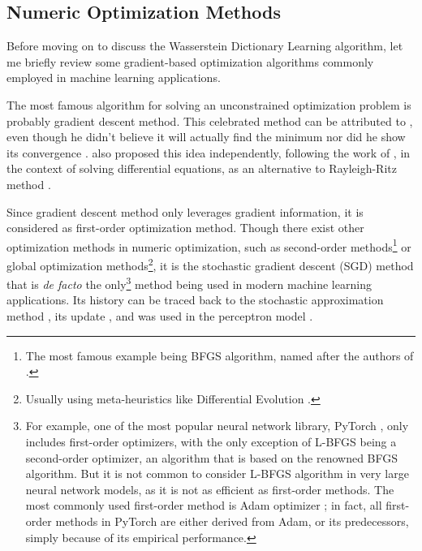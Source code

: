 


\subsection{Numeric Optimization Methods}\label{subsec:numeric-optimization-methods}

Before moving on to discuss the Wasserstein Dictionary Learning algorithm,
let me briefly review some gradient-based optimization algorithms commonly employed in machine learning applications.

The most famous algorithm for solving an unconstrained optimization problem is probably gradient descent method.
This celebrated method can be attributed to \citet{cauchy1847}, even though he didn't
believe it will actually find the minimum nor did he show its convergence \citep{lemarechal2012}.
\citet{hadamard1908} also proposed this idea independently, following the work of \citet{hilbert1900},
in the context of solving differential equations,
as an alternative to Rayleigh-Ritz method \citep{rayleigh1896,ritz1909,courant1943}.

Since gradient descent method only leverages gradient information, it is considered as first-order optimization method.
Though there exist other optimization methods in numeric optimization,
such as second-order methods\footnote{
  The most famous example being BFGS algorithm,
  named after the authors of \citet{broyden1970,fletcher1970,goldfarb1970,shanno1970}.
} or global optimization methods\footnote{
  Usually using meta-heuristics like Differential Evolution \citep{storn1997}.
},
it is the stochastic gradient descent (SGD) method that is \textit{de facto} the only\footnote{
  For example, one of the most popular neural network library, PyTorch \citep{paszke2017},
  only includes first-order optimizers, with the only exception of L-BFGS \citep{liu1989} being a second-order optimizer,
  an algorithm that is based on the renowned BFGS algorithm.
  But it is not common to consider L-BFGS algorithm in very large neural network models,
  as it is not as efficient as first-order methods.
  The most commonly used first-order method is Adam optimizer \citep{kingma2015};
  in fact, all first-order methods in PyTorch are either derived from Adam, or its predecessors,
  simply because of its empirical performance.
}
method being used in modern machine learning applications.
Its history can be traced back to the stochastic approximation method \citep{robbins1951},
its update \citep{kiefer1952},
and was used in the perceptron model \citep{rosenblatt1958}.

